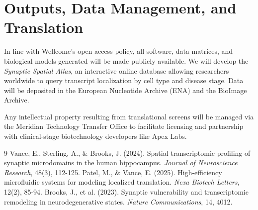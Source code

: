 \documentclass[10pt,a4paper]{article}
\begin{document}
\section{Outputs, Data Management, and Translation}

In line with Wellcome's open access policy, all software, data matrices, and biological models generated will be made publicly available. We will develop the \textit{Synaptic Spatial Atlas}, an interactive online database allowing researchers worldwide to query transcript localization by cell type and disease stage. Data will be deposited in the European Nucleotide Archive (ENA) and the BioImage Archive.

Any intellectual property resulting from translational screens will be managed via the Meridian Technology Transfer Office to facilitate licensing and partnership with clinical-stage biotechnology developers like Apex Labs.

\begin{thebibliography}{9}
\small
{}
Vance, E., Sterling, A., \& Brooks, J. (2024). Spatial transcriptomic profiling of synaptic microdomains in the human hippocampus. \textit{Journal of Neuroscience Research}, 48(3), 112-125.
Patel, M., \& Vance, E. (2025). High-efficiency microfluidic systems for modeling localized translation. \textit{Nexa Biotech Letters}, 12(2), 85-94.
Brooks, J., et al. (2023). Synaptic vulnerability and transcriptomic remodeling in neurodegenerative states. \textit{Nature Communications}, 14, 4012.
\end{thebibliography}
\end{document}
